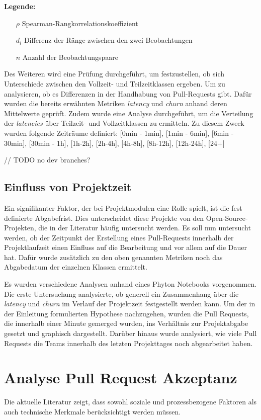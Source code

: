 \noindent\textbf{Legende:}
\begin{itemize}
  \item[$\rho$] Spearman-Rangkorrelationskoeffizient
  \item[$d_i$] Differenz der Ränge zwischen den zwei Beobachtungen 
  \item[$n$] Anzahl der Beobachtungspaare
\end{itemize}

Des Weiteren wird eine Prüfung durchgeführt, um festzustellen, ob sich Unterschiede zwischen den Vollzeit- und Teilzeitklassen ergeben. Um zu analysieren, ob es Differenzen in der Handhabung von Pull-Requests gibt. Dafür wurden die bereits erwähnten Metriken \textit{latency} und \textit{churn} anhand deren Mittelwerte geprüft. Zudem wurde eine Analyse durchgeführt, um die Verteilung der \textit{latencies} über Teilzeit- und Vollzeitklassen zu ermitteln. Zu diesem Zweck wurden folgende Zeiträume definiert: [0min - 1min], [1min - 6min], [6min - 30min], [30min - 1h], [1h-2h], [2h-4h], [4h-8h], [8h-12h], [12h-24h], [24+]

// TODO no dev branches?
\subsection{Einfluss von Projektzeit}
Ein signifikanter Faktor, der bei Projektmodulen eine Rolle spielt, ist die fest definierte Abgabefrist. Dies unterscheidet diese Projekte von den Open-Source-Projekten, die in der Literatur häufig untersucht werden. Es soll nun untersucht werden, ob der Zeitpunkt der Erstellung eines Pull-Requests innerhalb der Projektlaufzeit einen Einfluss auf die Bearbeitung und vor allem auf die Dauer hat. Dafür wurde zusätzlich zu den oben genannten Metriken noch das Abgabedatum der einzelnen Klassen ermittelt.

Es wurden verschiedene Analysen anhand eines Phyton Notebooks vorgenommen. Die erste Untersuchung analysierte, ob generell ein Zusammenhang über die \textit{latency} und \textit{churn} im Verlauf der Projektzeit festgestellt werden kann.  Um der in der Einleitung formulierten Hypothese nachzugehen, wurden die Pull Requests, die innerhalb einer Minute gemerged wurden, ins Verhältnis zur Projektabgabe gesetzt und graphisch dargestellt. Darüber hinaus wurde analysiert, wie viele Pull Requests die Teams innerhalb des letzten Projekttages noch abgearbeitet haben.


\section{Analyse Pull Request Akzeptanz}
Die aktuelle Literatur zeigt, dass sowohl soziale und prozessbezogene Faktoren als auch technische Merkmale berücksichtigt werden müssen. 

